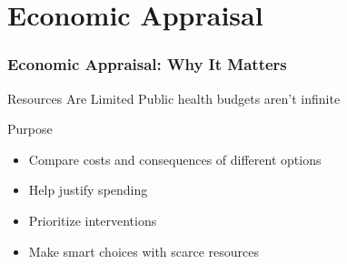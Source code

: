 \documentclass{beamer}
\begin{document}
\section{Economic Appraisal}

\begin{frame}
\frametitle{Economic Appraisal: Why It Matters}

{
\begin{alertblock}{Resources Are Limited}
Public health budgets aren't infinite
\end{alertblock}}

{
\begin{block}{Purpose}
\begin{itemize}[label=\textbullet, itemsep=0.2em] %
    \item Compare costs and consequences of different options
    \item Help justify spending
    \item Prioritize interventions
    \item Make smart choices with scarce resources
\end{itemize}
\end{block}}

\vspace{0.2cm}
\begin{center}
\end{center}
\end{frame}
\end{document}
